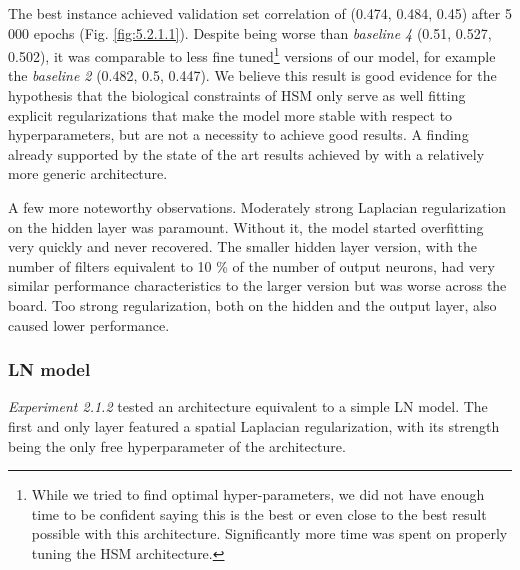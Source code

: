 The best instance achieved validation set correlation of (0.474, 0.484, 0.45) after 5 000 epochs (Fig. \ref{fig:5.2.1.1}). Despite being worse than \textit{baseline 4} (0.51, 0.527, 0.502), it was comparable to less fine tuned\footnote{While we tried to find optimal hyper-parameters, we did not have enough time to be confident saying this is the best or even close to the best result possible with this architecture. Significantly more time was spent on properly tuning the HSM architecture.} versions of our model, for example the \textit{baseline 2} (0.482, 0.5, 0.447). We believe this result is good evidence for the hypothesis that the biological constraints of HSM only serve as well fitting explicit regularizations that make the model more stable with respect to hyperparameters, but are not a necessity to achieve good results. A finding already supported by the state of the art results achieved by \cite{klindt} with a relatively more generic architecture.

A few more noteworthy observations. Moderately strong Laplacian regularization on the hidden layer was paramount. Without it, the model started overfitting very quickly and never recovered. The smaller hidden layer version, with the number of filters equivalent to 10 \% of the number of output neurons, had very similar performance characteristics to the larger version but was worse across the board. Too strong regularization, both on the hidden and the output layer, also caused lower performance.

\subsubsection{LN model}

\textit{Experiment 2.1.2} tested an architecture equivalent to a simple LN model. The first and only layer featured a spatial Laplacian regularization, with its strength being the only free hyperparameter of the architecture. 

